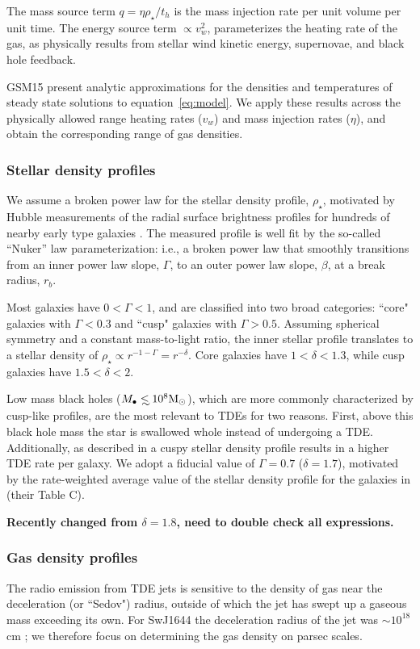 \documentclass[usenatbib,fleqn]{mnras}
\newcommand\lsim{\mathrel{\rlap{\lower4pt\hbox{\hskip1pt$\sim$}}
    \raise1pt\hbox{$<$}}}
\newcommand{\Mbh}[1][]{M_{\bullet#1}}
\renewcommand{\th}{t_h}
\newcommand{\Msun}{{\rm M_\odot}}
\begin{document}
The mass source term $q =\eta \rho_\star/\th$ is the mass injection
rate per unit volume per unit time. The energy source term $\propto v_w^{2}$, parameterizes the
heating rate of the gas, as physically results from stellar wind
kinetic energy, supernovae, and black hole feedback.

GSM15 present analytic approximations for the
densities and temperatures of steady state solutions to
equation~\eqref{eq:model}. We apply these results across the
physically allowed range heating rates ($v_w$) and mass injection
rates ($\eta$), and obtain the corresponding range of gas densities.

\subsubsection{Stellar density profiles}
We assume a broken power law for the stellar density profile, $\rho_{\star}$,  motivated by Hubble measurements of the radial surface brightness profiles for hundreds of nearby early type galaxies \citep{Lauer+2007}.  The measured profile is well fit by the so-called ``Nuker'' law parameterization:
i.e., a broken power law that smoothly transitions from an inner power law
slope, $\Gamma$, to an outer power law slope, $\beta$, at a break
radius, $r_b$.

Most galaxies have $0<\Gamma<1$, and are classified into two broad
categories: ``core" galaxies with $\Gamma<0.3$ and ``cusp" galaxies with
$\Gamma>0.5$. Assuming spherical symmetry and a constant mass-to-light
ratio, the inner stellar profile translates to a stellar density of
$\rho_\star\propto r^{-1-\Gamma}=r^{-\delta}$. Core galaxies have
$1<\delta<1.3$, while cusp galaxies have $1.5<\delta<2$.

Low mass black holes ($\Mbh\lsim 10^{8} \Msun$), which are more commonly characterized by cusp-like profiles, are the most relevant to TDEs for two reasons.  First, above this black hole mass the star is swallowed whole instead of undergoing a TDE.  Additionally, as described in \citet{Stone&Metzger2016} 
a cuspy stellar density profile results in a higher TDE rate per galaxy.  We adopt a fiducial value of $\Gamma=0.7$ ($\delta=1.7$), motivated by the rate-weighted average value of the stellar density profile for the galaxies in \citet{Stone&Metzger2016} (their Table C).

 {\bf Recently changed from $\delta=1.8$, need to
  double check all expressions.}

\subsubsection{Gas density profiles}
The radio emission from TDE jets is sensitive to the density of gas near the deceleration (or ``Sedov") radius, outside of which the jet has swept up a gaseous mass exceeding its own.  For SwJ1644 the deceleration
radius of the jet was $\sim 10^{18}$ cm \citep{Mimica+2015}; we therefore focus on determining the gas density on parsec scales.
\end{document}
